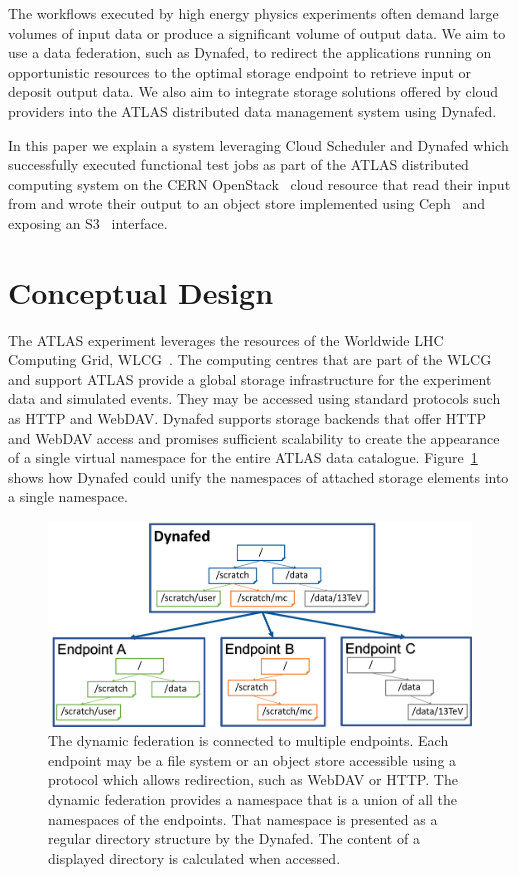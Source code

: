 \documentclass[a4paper]{jpconf}
\begin{document}
The workflows executed by high energy physics experiments often demand large volumes of input data or produce a significant volume of output data. We aim to use a data federation, such as Dynafed, to redirect the applications running on opportunistic resources to the optimal storage endpoint to retrieve input or deposit output data. We also aim to integrate storage solutions offered by cloud providers into the ATLAS distributed data management system using Dynafed.

In this paper we explain a system leveraging Cloud Scheduler and Dynafed which successfully executed functional test jobs as part of the ATLAS distributed computing system on the CERN OpenStack~\cite{openstack} cloud resource that read their input from and wrote their output to an object store implemented using Ceph~\cite{ceph} and exposing an S3~\cite{s3} interface.

\section{Conceptual Design}
The ATLAS experiment leverages the resources of the Worldwide LHC Computing Grid, WLCG~\cite{wlcg}. The computing centres that are part of the WLCG and support ATLAS provide a global storage infrastructure for the experiment data and simulated events.
They may be accessed using standard protocols such as HTTP and WebDAV. Dynafed supports storage backends that offer HTTP and WebDAV access and promises sufficient scalability to create the appearance of a single virtual namespace for the entire ATLAS data catalogue.  Figure~\ref{fig:conceptual-design} shows how Dynafed could unify the namespaces of attached storage elements into a single namespace.

\begin{figure}
  \centering
  \includegraphics[width=\textwidth]{conceptual-design.png}
  \caption{The dynamic federation is connected to multiple endpoints. Each endpoint may be a file system or an object store accessible using a protocol which allows redirection, such as WebDAV or HTTP. The dynamic federation provides a namespace that is a union of all the namespaces of the endpoints. That namespace is presented as a regular directory structure by the Dynafed. The content of a displayed directory is calculated when accessed.}
  \label{fig:conceptual-design}
\end{figure}
\end{document}
